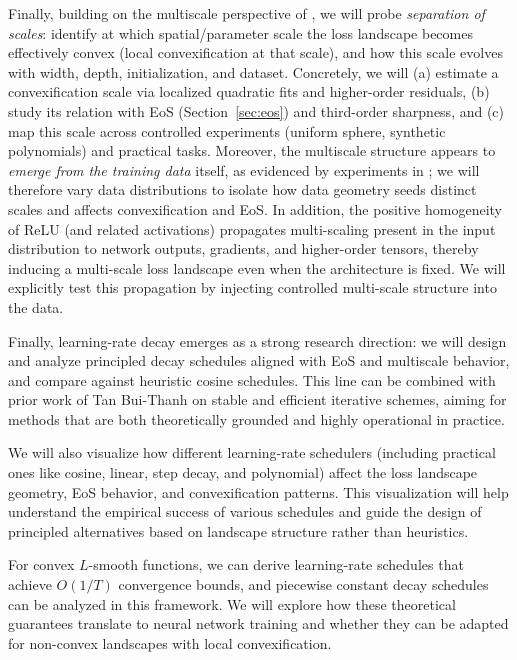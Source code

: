 \documentclass[12pt]{article}
\begin{document}
Finally, building on the multiscale perspective of \cite{ma2022quadraticapproximationmultiscalestructure}, we will probe \emph{separation of scales}: identify at which spatial/parameter scale the loss landscape becomes effectively convex (local convexification at that scale), and how this scale evolves with width, depth, initialization, and dataset. Concretely, we will (a) estimate a convexification scale via localized quadratic fits and higher-order residuals, (b) study its relation with EoS (Section~\ref{sec:eos}) and third-order sharpness, and (c) map this scale across controlled experiments (uniform sphere, synthetic polynomials) and practical tasks.
Moreover, the multiscale structure appears to \emph{emerge from the training data} itself, as evidenced by experiments in \cite{ma2022quadraticapproximationmultiscalestructure}; we will therefore vary data distributions to isolate how data geometry seeds distinct scales and affects convexification and EoS.
In addition, the positive homogeneity of ReLU (and related activations) propagates multi-scaling present in the input distribution to network outputs, gradients, and higher-order tensors, thereby inducing a multi-scale loss landscape even when the architecture is fixed. We will explicitly test this propagation by injecting controlled multi-scale structure into the data.

Finally, learning-rate decay emerges as a strong research direction: we will design and analyze principled decay schedules aligned with EoS and multiscale behavior, and compare against heuristic cosine schedules. This line can be combined with prior work of Tan Bui-Thanh on stable and efficient iterative schemes, aiming for methods that are both theoretically grounded and highly operational in practice.

We will also visualize how different learning-rate schedulers (including practical ones like cosine, linear, step decay, and polynomial) affect the loss landscape geometry, EoS behavior, and convexification patterns. This visualization will help understand the empirical success of various schedules and guide the design of principled alternatives based on landscape structure rather than heuristics.

For convex \(L\)-smooth functions, we can derive learning-rate schedules that achieve \(O(1/T)\) convergence bounds, and piecewise constant decay schedules can be analyzed in this framework. We will explore how these theoretical guarantees translate to neural network training and whether they can be adapted for non-convex landscapes with local convexification.
\end{document}
